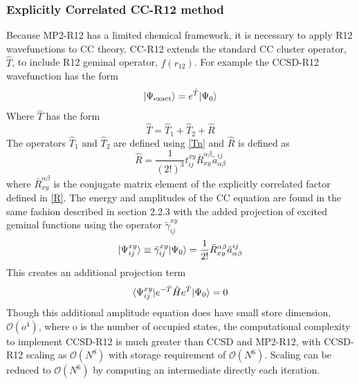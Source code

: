     \subsubsection{Explicitly Correlated CC-R12 method}
      Because MP2-R12 has a limited chemical framework, it is necessary to apply R12 wavefunctions to CC theory\cite{Kong2012}. CC-R12 extends the standard CC cluster operator, $\hat{T}$, to include R12 geminal operator, $f(r_{12})$\cite{Noga1992,Noga1994}. For example the CCSD-R12 wavefunction has the form 
        \begin{equation}
          | \Psi_{\text{exact}} \rangle = e^{\hat{T}}| \Psi_0 \rangle
        \end{equation}
      Where $\hat{T}$ has the form
        \begin{equation}
          \hat{T} = \hat{T}_1 + \hat{T}_2 + \hat{R}
        \end{equation}
      The operators $\hat{T}_1 \text{ and } \hat{T}_2$ are defined using \cref{Tn} and $\hat{R}$ is defined as 
        \begin{equation}
          \hat{R} = \frac{1}{(2!)^3} t^{xy}_{ij} \bar{R}^{\alpha \beta}_{xy} \tilde{a}^{ij}_{\alpha \beta}
        \end{equation}
      where $\bar{R}^{\alpha \beta}_{xy}$ is the conjugate matrix element of the explicitly correlated factor defined in \cref{R}.
      The energy and amplitudes of the CC equation are found in the same fashion described in section 2.2.3 with the added projection of excited geminal functions using the operator $\tilde{\gamma}^{xy}_{ij}$
        \begin{equation}
          | \Psi^{xy}_{ij} \rangle \equiv \tilde{\gamma}^{xy}_{ij}| \Psi_0 \rangle = \frac{1}{2!} \bar{R}^{\alpha \beta}_{xy} \tilde{a}^{ij}_{\alpha \beta}
        \end{equation}
      This creates an additional projection term
        \begin{equation}
          \langle\Psi^{xy}_{ij} | e^{-\hat{T}} \hat{H} e^{\hat{T}} | \Psi_0 \rangle = 0
        \end{equation}
      Though this additional amplitude equation does have small store dimension, $\mathcal{O}(o^4)$, where o is the number of occupied states, the computational complexity to implement CCSD-R12 is much greater than CCSD and MP2-R12, with CCSD-R12 scaling as $\mathcal{O}(N^8)$ with storage requirement of $\mathcal{O}(N^6)$. Scaling can be reduced to $\mathcal{O}(N^6)$ by computing an intermediate directly each iteration.\cite{Kong2012}
